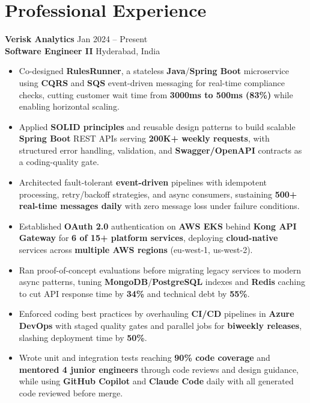 \documentclass[a4paper,10pt]{article}
\begin{document}
\section*{Professional Experience}

\textbf{Verisk Analytics} \hfill Jan 2024 -- Present \\
\textbf{Software Engineer II} \hfill Hyderabad, India

\begin{itemize}[leftmargin=*]
    \item Co-designed \textbf{RulesRunner}, a stateless \textbf{Java}/\textbf{Spring Boot} microservice using \textbf{CQRS} and \textbf{SQS} event-driven messaging for real-time compliance checks, cutting customer wait time from \textbf{3000ms to 500ms (83\%)} while enabling horizontal scaling.
    \item Applied \textbf{SOLID principles} and reusable design patterns to build scalable \textbf{Spring Boot} REST APIs serving \textbf{200K+ weekly requests}, with structured error handling, validation, and \textbf{Swagger/OpenAPI} contracts as a coding-quality gate.
    \item Architected fault-tolerant \textbf{event-driven} pipelines with idempotent processing, retry/backoff strategies, and async consumers, sustaining \textbf{500+ real-time messages daily} with zero message loss under failure conditions.
    \item Established \textbf{OAuth 2.0} authentication on \textbf{AWS EKS} behind \textbf{Kong API Gateway} for \textbf{6 of 15+ platform services}, deploying \textbf{cloud-native} services across \textbf{multiple AWS regions} (eu-west-1, us-west-2).
    \item Ran proof-of-concept evaluations before migrating legacy services to modern async patterns, tuning \textbf{MongoDB}/\textbf{PostgreSQL} indexes and \textbf{Redis} caching to cut API response time by \textbf{34\%} and technical debt by \textbf{55\%}.
    \item Enforced coding best practices by overhauling \textbf{CI/CD} pipelines in \textbf{Azure DevOps} with staged quality gates and parallel jobs for \textbf{biweekly releases}, slashing deployment time by \textbf{50\%}.
    \item Wrote unit and integration tests reaching \textbf{90\% code coverage} and \textbf{mentored 4 junior engineers} through code reviews and design guidance, while using \textbf{GitHub Copilot} and \textbf{Claude Code} daily with all generated code reviewed before merge.
\end{itemize}
\end{document}
